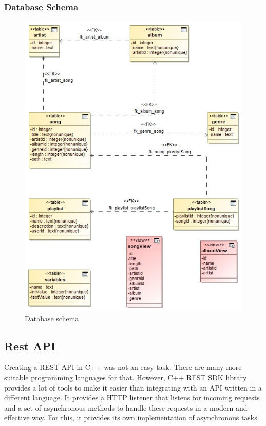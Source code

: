 \subsubsection{Database Schema}
\begin{figure}[ht]\centering
\includegraphics[width=1.0\textwidth]{img/DbDiagram2.png}
\caption{Database schema}
\label{fig03:dbSchema}
\end{figure}

\subsection{Rest API}
Creating a REST API in C++ was not an easy task. There are many more suitable programming languages for that. However, C++ REST SDK library provides a lot of tools to make it easier than integrating with an API written in a different language. It provides a HTTP listener that listens for incoming requests and a set of asynchronous methods to handle these requests in a modern and effective way. For this, it provides its own implementation of asynchronous tasks.

